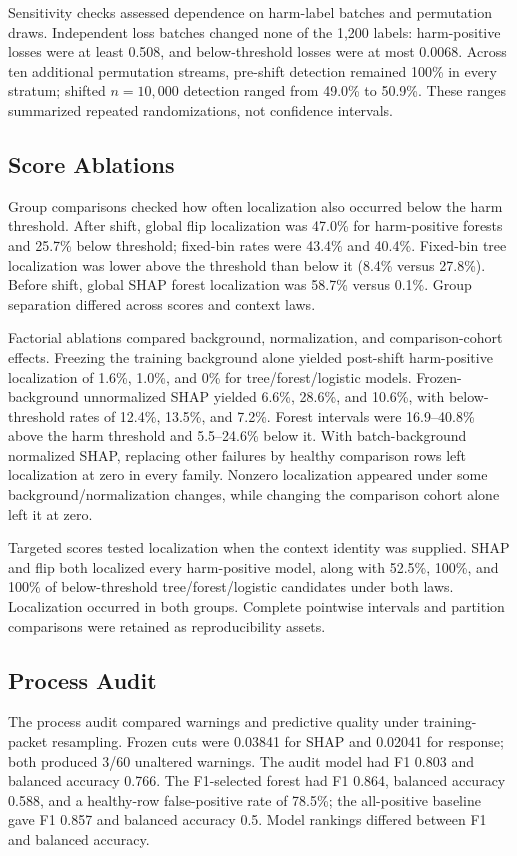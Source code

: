 \documentclass[conference]{IEEEtran}
\begin{document}
Sensitivity checks assessed dependence on harm-label batches and permutation draws. Independent loss batches changed none of the 1,200 labels: harm-positive losses were at least 0.508, and below-threshold losses were at most 0.0068. Across ten additional permutation streams, pre-shift detection remained 100\% in every stratum; shifted $n=10{,}000$ detection ranged from 49.0\% to 50.9\%. These ranges summarized repeated randomizations, not confidence intervals.

\subsection{Score Ablations}
Group comparisons checked how often localization also occurred below the harm threshold. After shift, global flip localization was 47.0\% for harm-positive forests and 25.7\% below threshold; fixed-bin rates were 43.4\% and 40.4\%. Fixed-bin tree localization was lower above the threshold than below it (8.4\% versus 27.8\%). Before shift, global SHAP forest localization was 58.7\% versus 0.1\%. Group separation differed across scores and context laws.

Factorial ablations compared background, normalization, and comparison-cohort effects. Freezing the training background alone yielded post-shift harm-positive localization of 1.6\%, 1.0\%, and 0\% for tree/forest/logistic models. Frozen-background unnormalized SHAP yielded 6.6\%, 28.6\%, and 10.6\%, with below-threshold rates of 12.4\%, 13.5\%, and 7.2\%. Forest intervals were 16.9--40.8\% above the harm threshold and 5.5--24.6\% below it. With batch-background normalized SHAP, replacing other failures by healthy comparison rows left localization at zero in every family. Nonzero localization appeared under some background/normalization changes, while changing the comparison cohort alone left it at zero.

Targeted scores tested localization when the context identity was supplied. SHAP and flip both localized every harm-positive model, along with 52.5\%, 100\%, and 100\% of below-threshold tree/forest/logistic candidates under both laws. Localization occurred in both groups. Complete pointwise intervals and partition comparisons were retained as reproducibility assets.

\subsection{Process Audit}
The process audit compared warnings and predictive quality under training-packet resampling. Frozen cuts were 0.03841 for SHAP and 0.02041 for response; both produced 3/60 unaltered warnings. The audit model had F1 0.803 and balanced accuracy 0.766. The F1-selected forest had F1 0.864, balanced accuracy 0.588, and a healthy-row false-positive rate of 78.5\%; the all-positive baseline gave F1 0.857 and balanced accuracy 0.5. Model rankings differed between F1 and balanced accuracy.
\end{document}
